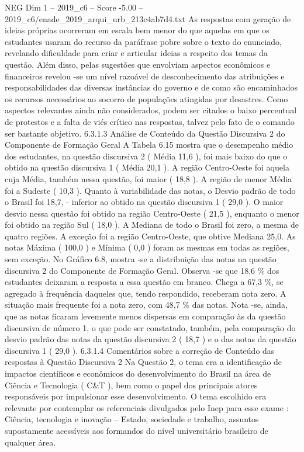 \begin{textsample}{NEG Dim 1 – 2019\_c6 – Score -5.00 – 2019\_c6/enade\_2019\_arqui\_urb\_213c4ab7d4.txt}
As respostas com geração de ideias próprias ocorreram em escala bem menor do que aquelas em que os estudantes usaram do recurso da paráfrase pobre sobre o texto do enunciado, revelando dificuldade para criar e articular ideias a respeito dos temas da questão.
Além disso, pelas sugestões que envolviam aspectos econômicos e financeiros revelou -se um nível razoável de desconhecimento das atribuições e responsabilidades das diversas instâncias do governo e de como são encaminhados os recursos necessários ao socorro de populações atingidas por desastres.
Como aspectos relevantes ainda não considerados, podem ser citados o baixo percentual de protestos e a falta de viés crítico nas respostas, talvez pelo fato de o comando ser bastante objetivo. 6.3.1.3 Análise de Conteúdo da Questão Discursiva 2 do Componente de Formação Geral A Tabela 6.15 mostra que o desempenho médio dos estudantes, na questão discursiva 2 ( Média 11,6 ), foi mais baixo do que o obtido na questão discursiva 1 ( Média 20,1 ).
A região Centro-Oeste foi aquela cuja Média, também nessa questão, foi maior ( 18,8 ).
A região de menor Média foi a Sudeste ( 10,3 ).
Quanto à variabilidade das notas, o Desvio padrão de todo o Brasil foi 18,7, - inferior ao obtido na questão discursiva 1 ( 29,0 ).
O maior desvio nessa questão foi obtido na região Centro-Oeste ( 21,5 ), enquanto o menor foi obtido na região Sul ( 18,0 ).
A Mediana de todo o Brasil foi zero, a mesma de quatro regiões.
A exceção foi a região Centro-Oeste, que obtive Mediana 25,0.
As notas Máxima ( 100,0 ) e Mínima ( 0,0 ) foram as mesmas em todas as regiões, sem exceção.
No Gráfico 6.8, mostra -se a distribuição das notas na questão discursiva 2 do Componente de Formação Geral.
Observa -se que 18,6 \% dos estudantes deixaram a resposta a essa questão em branco.
Chega a 67,3 \%, se agregado à frequência daqueles que, tendo respondido, receberam nota zero.
A situação mais frequente foi a nota zero, com 48,7 \% das notas.
Nota -se, ainda, que as notas ficaram levemente menos dispersas em comparação às da questão discursiva de número 1, o que pode ser constatado, também, pela comparação do desvio padrão das notas da questão discursiva 2 ( 18,7 ) e o das notas da questão discursiva 1 ( 29,0 ). 6.3.1.4 Comentários sobre a correção de Conteúdo das respostas à Questão Discursiva 2 Na Questão 2, o tema era a identificação de impactos científicos e econômicos do desenvolvimento do Brasil na área de Ciência e Tecnologia ( C\&T ), bem como o papel dos principais atores responsáveis por impulsionar esse desenvolvimento.
O tema escolhido era relevante por contemplar os referenciais divulgados pelo Inep para esse exame : Ciência, tecnologia e inovação – Estado, sociedade e trabalho, assuntos supostamente acessíveis aos formandos do nível universitário brasileiro de qualquer área.

\end{textsample}
